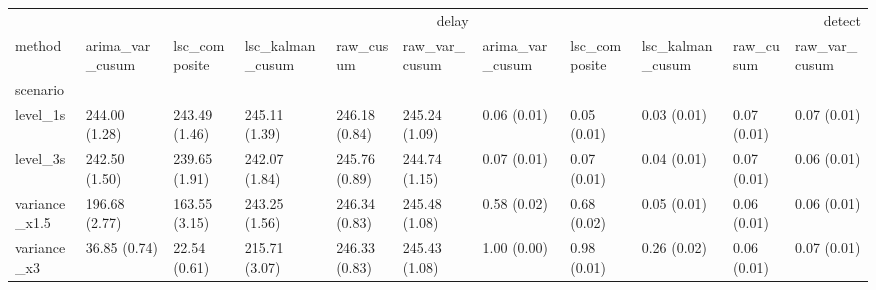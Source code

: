 \begin{tabular}{lllllllllll}
\toprule
 & \multicolumn{5}{r}{delay} & \multicolumn{5}{r}{detect} \\
method & arima_var_cusum & lsc_composite & lsc_kalman_cusum & raw_cusum & raw_var_cusum & arima_var_cusum & lsc_composite & lsc_kalman_cusum & raw_cusum & raw_var_cusum \\
scenario &  &  &  &  &  &  &  &  &  &  \\
\midrule
level_1s & 244.00 (1.28) & 243.49 (1.46) & 245.11 (1.39) & 246.18 (0.84) & 245.24 (1.09) & 0.06 (0.01) & 0.05 (0.01) & 0.03 (0.01) & 0.07 (0.01) & 0.07 (0.01) \\
level_3s & 242.50 (1.50) & 239.65 (1.91) & 242.07 (1.84) & 245.76 (0.89) & 244.74 (1.15) & 0.07 (0.01) & 0.07 (0.01) & 0.04 (0.01) & 0.07 (0.01) & 0.06 (0.01) \\
variance_x1.5 & 196.68 (2.77) & 163.55 (3.15) & 243.25 (1.56) & 246.34 (0.83) & 245.48 (1.08) & 0.58 (0.02) & 0.68 (0.02) & 0.05 (0.01) & 0.06 (0.01) & 0.06 (0.01) \\
variance_x3 & 36.85 (0.74) & 22.54 (0.61) & 215.71 (3.07) & 246.33 (0.83) & 245.43 (1.08) & 1.00 (0.00) & 0.98 (0.01) & 0.26 (0.02) & 0.06 (0.01) & 0.07 (0.01) \\
\bottomrule
\end{tabular}
